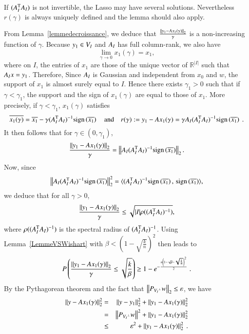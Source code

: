 \begin{remarque}
If $(A_I^\mathrm{T} A_I)$ is not invertible, the Lasso may have several solutions. Nevertheless $r(\gamma)$ is always uniquely defined and the lemma should also apply. 
\end{remarque}

From Lemma~\ref{lemmedecroissance}, we deduce that $\frac{\left\Vert{y_1-Ax_1(\gamma)}\right\Vert_{2}}{\gamma}$ is a non-increasing function of $\gamma$. Because $y_1\in {V_I}$ and $A_I$ has full column-rank, we also have
\begin{equation*}
\lim_{\gamma \to 0}x_1(\gamma)=x_1,
\end{equation*}
where on $I$, the entries of $x_1$ are those of the unique vector of $\mathbb{R}^{|I|}$ such that $A_I x =y_1$. Therefore,
Since $A_I$ is Gaussian and independent from $x_0$ and $w$, the support of $x_1$ is almost surely equal to $I$. Hence there exists $\gamma_1>0$ such that if $\gamma<\gamma_1$, the support and the sign of $x_1(\gamma)$ are equal to those of $x_1$. More precisely, if $\gamma<\gamma_1$, $x_1(\gamma)$ satisfies 
\begin{equation*}
\overline{x_1(\gamma)}=\overline{x_1}-\gamma(A_I^\mathrm{T} A_I)^{-1}\mathrm{sign}\left(\overline{x_1}\right) \quad \text{and} \quad r(\gamma):=y_1-Ax_1(\gamma)=\gamma A_I(A_I^\mathrm{T} A_I)^{-1}\mathrm{sign}\left(\overline{x_1}\right) ~.
\end{equation*}  
It then follows that for $\gamma\in(0,\gamma_1)$,
\[
\frac{\left\Vert{y_1-Ax_1(\gamma)}\right\Vert_{2}}{\gamma}=\left\Vert{A_I(A_I^\mathrm{T}A_I)^{-1}\mathrm{sign}\left(\overline{x_1}\right)}\right\Vert_{2}.
\]
Now, since
\begin{equation*}
\left\Vert{A_I(A_I^\mathrm{T}A_I)^{-1}\mathrm{sign}\left(\overline{x_1}\right)}\right\Vert_{2}^2=\langle (A_I^\mathrm{T} A_I)^{-1}\mathrm{sign}\left(\overline{x_1}\right),\,\mathrm{sign}\left(\overline{x_1}\right)\rangle,
\end{equation*}
we deduce that for all $\gamma>0$,
\[
\frac{\left\Vert{y_1-Ax_1(\gamma)}\right\Vert_{2}}{\gamma}\leq \sqrt{|I|\rho((A_I^\mathrm{T} A_I)^{-1})},
\]
where $\rho((A_I^\mathrm{T} A_I)^{-1})$ is the spectral radius of $(A_I^\mathrm{T} A_I)^{-1}$. Using Lemma~\ref{LemmeVSWishart} with  $\beta<\left(1-\sqrt{\frac{k}{n}}\right)^2$ then leads to
\begin{equation}\label{eqborneresidu}
P\left(\frac{\left\Vert{y_1-Ax_1(\gamma)}\right\Vert_{2}}{\gamma}\leq 
\sqrt{\frac{k}{\beta}}\right) \geq 1-e^{-\frac{n\left(1-\sqrt{\beta}-\sqrt{\frac{k}{n}}\right)^2}{2}} ~.
\end{equation}
By the Pythagorean theorem and the fact that $\left\Vert{P_{{V_I}^\perp} w}\right\Vert_{2} \leq \varepsilon$, we have 
\begin{eqnarray*}
\left\Vert{y-Ax_1(\gamma)}\right\Vert_{2}^2 &=& \left\Vert{y-y_1}\right\Vert_{2}^2 + \left\Vert{y_1-Ax_1(\gamma)}\right\Vert_{2}^2 \\
			 &=& \left\Vert{P_{{V_I}^\perp} w}\right\Vert^2 + \left\Vert{y_1-Ax_1(\gamma)}\right\Vert_{2}^2 \\
			 &\leq& \varepsilon^2+\left\Vert{y_1-Ax_1(\gamma)}\right\Vert_{2}^2 ~.
\end{eqnarray*}
